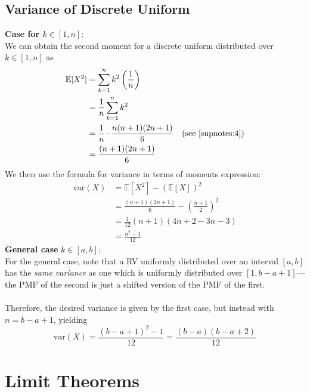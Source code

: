 \documentclass{report}
\begin{document}
\subsection{Variance of Discrete Uniform}
\textbf{Case for $k\in[1,n]$}:\\
We can obtain the second moment for a discrete uniform distributed over $k\in[1,n]$ as
\begin{align*}
\mathbb{E}[X^2]&=\sum^{n}_{k=1}k^2\left(\frac{1}{n}\right)\\
&=\frac{1}{n}\sum^{n}_{k=1}k^2\\
&=\frac{1}{n}\cdot\frac{n(n+1)(2n+1)}{6}\quad\text{(see \ref{supnotes:4})}\\
&=\frac{(n+1)(2n+1)}{6}
\end{align*}
We then use the formula for variance in terms of moments expression:
\begin{align*}
\text{var}(X)&=\mathbb{E}[X^2]-(\mathbb{E}[X])^2\\
&=\frac{(n+1)(2n+1)}{6}-\left(\frac{n+1}{2}\right)^2\\
&=\frac{1}{12}(n+1)(4n+2-3n-3)\\
&=\frac{n^2-1}{12}
\end{align*}
\textbf{General case} $k\in[a,b]$:\\
For the general case, note that a RV uniformly distributed over an interval $[a,b]$ has the \textit{same variance}
as one which is uniformly distributed over $[1,b-a+1]$---the PMF of the second is just a shifted version
of the PMF of the first.\\
\vspace{1mm}\\
Therefore, the desired variance is given by the first case, but instead with $n=b-a+1$, yielding
\begin{equation*}
\boxed{\text{var}(X)=\frac{(b-a+1)^2-1}{12}=\frac{(b-a)(b-a+2)}{12}}
\end{equation*}
\newpage

\section{Limit Theorems}
\end{document}
